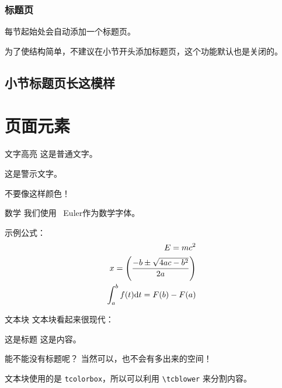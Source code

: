 \documentclass[no-math, aspectratio=1610, 10pt]{beamer}
\begin{document}
    \begin{frame}
        \frametitle{标题页}
        每节起始处会自动添加一个标题页。
        
        为了使结构简单，不建议在小节开头添加标题页，这个功能默认也是关闭的。
    \end{frame}

    \subsection{小节标题页长这模样}

    \section{页面元素}

    \begin{frame}{文字高亮}
        这是普通文字。


        \alert{这是警示文字。}

        不要像这样\alert{颜色}！
    \end{frame}

    \begin{frame}{数学}
        我们使用 \AmS\ Euler作为数学字体。

        示例公式：
        \begin{align}
            E = mc^2\\
            {x} = \left(\frac{-b \pm \sqrt{4ac - b^2}}{2a}\right)\\
            \int_a^b f(t){\rm d}t = F(b) - F(a)
        \end{align}
    \end{frame}

    \begin{frame}[fragile]{文本块}
        文本块看起来很现代：

        \begin{block}{这是标题}
            这是内容。
        \end{block}

        \begin{block}{}
            \applyparskip
            能不能没有标题呢？
            \tcblower
            当然可以，也不会有多出来的空间！
            
            文本块使用的是 \texttt{tcolorbox}，所以可以利用 \verb|\tcblower| 来分割内容。
        \end{block}
    \end{frame}
\end{document}
